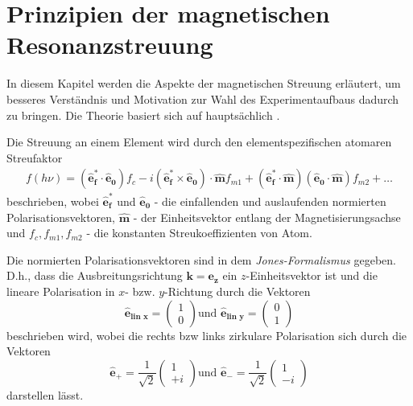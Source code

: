 \chapter{Prinzipien der magnetischen Resonanzstreuung}
\label{text:streuung}
In diesem Kapitel werden die Aspekte der magnetischen Streuung erläutert, um besseres Verständnis und Motivation zur Wahl des Experimentaufbaus dadurch zu bringen. Die Theorie basiert sich auf hauptsächlich \cite{kortright_resonant_2013}. 


\noindent
Die Streuung an einem Element wird durch den elementspezifischen atomaren Streufaktor
\begin{align}
f(h\nu) = (\mathbf{\hat{e}_f^*} \cdot \mathbf{\hat{e}_0})f_c - i(\mathbf{\hat{e}_f^*} \times \mathbf{\hat{e}_0})\cdot\mathbf{\hat{m}}f_{m1}+(\mathbf{\hat{e}_f^*} \cdot \mathbf{\hat{m}})(\mathbf{\hat{e}_0}\cdot\mathbf{\hat{m}})f_{m2} + \dots
\label{eq:atomfaktoren}
\end{align}
beschrieben, wobei $\mathbf{\hat{e}_f^*}$ und $\mathbf{\hat{e}_0}$ - die einfallenden und auslaufenden normierten Polarisationsvektoren, $\mathbf{\hat{m}}$ - der Einheitsvektor entlang der Magnetisierungsachse und $f_c, f_{m1}, f_{m2}$ - die konstanten Streukoeffizienten von Atom.

\noindent
Die normierten Polarisationsvektoren sind in dem \emph{Jones-Formalismus} gegeben. D.h., dass die Ausbreitungsrichtung $\mathbf{k} = \mathbf{e_{z}}$ ein $z$-Einheitsvektor ist und die lineare Polarisation in $x$- bzw. $y$-Richtung durch die Vektoren
\begin{equation}
    \mathbf{\hat{e}_{\text{lin $x$}}} = \begin{pmatrix}
    1\\
    0
    \end{pmatrix}
    \text{und }
    \mathbf{\hat{e}_{\text{lin $y$}}} = \begin{pmatrix}
    0\\
    1
    \end{pmatrix}    
\end{equation}
beschrieben wird, wobei die rechts bzw links zirkulare Polarisation sich durch die Vektoren 
\begin{equation}
    \mathbf{\hat{e}_+} = \frac{1}{\sqrt{2}}\begin{pmatrix}
    1\\
    +i
    \end{pmatrix}
    \text{und }
    \mathbf{\hat{e}_-} = \frac{1}{\sqrt{2}}\begin{pmatrix}
    1\\
    -i
    \end{pmatrix}    
\end{equation}
darstellen lässt.

